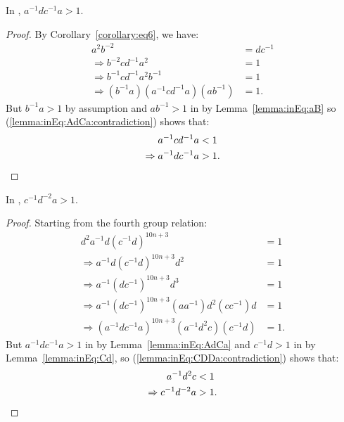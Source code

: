 \begin{lemma} In , $a^{-1}dc^{-1}a > 1$. \label{lemma:inEq:AdCa}
\end{lemma}
\begin{proof} By Corollary~\ref{corollary:eq6}, we have:
\begin{align}
a^{2}b^{-2}&=dc^{-1}\nonumber{}\\
\Rightarrow{}b^{-2}cd^{-1}a^{2} &= 1\nonumber{}\\
\Rightarrow{}b^{-1}cd^{-1}a^{2}b^{-1} &= 1\nonumber{}\\
\Rightarrow{}(b^{-1}a)(a^{-1}cd^{-1}a)(ab^{-1}) &= 1.\label{lemma:inEq:AdCa:contradiction}
\end{align}
But $b^{-1}a>1$ by assumption and $ab^{-1}>1$ in  by Lemma~\ref{lemma:inEq:aB} so (\ref{lemma:inEq:AdCa:contradiction}) shows that:
\begin{align*}
a^{-1}cd^{-1}a&<1\\
\Rightarrow{}a^{-1}dc^{-1}a&>1.\qedhere
\end{align*}
\end{proof}

\begin{lemma} In , $c^{-1}d^{-2}a>1$.
\label{lemma:inEq:CDDa}
\end{lemma}
\begin{proof} Starting from the fourth group relation:
\begin{align}
d^{2}a^{-1}d(c^{-1}d)^{10n+3} &= 1\nonumber{}\\
\Rightarrow{}a^{-1}d(c^{-1}d)^{10n+3}d^{2} &= 1\nonumber{}\\
\Rightarrow{}a^{-1}(dc^{-1})^{10n+3}d^{3}&=1\nonumber{}\\
\Rightarrow{}a^{-1}(dc^{-1})^{10n+3}(aa^{-1})d^{2}(cc^{-1})d&=1\nonumber{}\\
\Rightarrow{}(a^{-1}dc^{-1}a)^{10n+3}(a^{-1}d^{2}c)(c^{-1}d)&=1.\label{lemma:inEq:CDDa:contradiction}
\end{align}
But $a^{-1}dc^{-1}a>1$ in  by Lemma~\ref{lemma:inEq:AdCa} and $c^{-1}d>1$ in  by Lemma~\ref{lemma:inEq:Cd}, so (\ref{lemma:inEq:CDDa:contradiction}) shows that:
\begin{align*}
a^{-1}d^{2}c&<1\\
\Rightarrow{}c^{-1}d^{-2}a&>1.\qedhere
\end{align*}
\end{proof}

